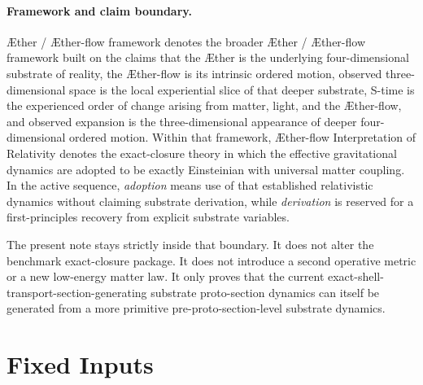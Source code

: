 \documentclass[11pt]{article}
\newcommand{\Aether}{\AE{}ther}
\newcommand{\Aflow}{\AE{}ther-flow}
\newcommand{\TheoryName}{\Aflow{} Interpretation of Relativity}
\newcommand{\TheoryProgram}{\Aether{} / \Aflow{} framework}
\begin{document}
\paragraph{Framework and claim boundary.}
\TheoryProgram{} denotes the broader \Aether{} / \Aflow{} framework built on the claims that the \Aether{} is the underlying four-dimensional substrate of reality, the \Aflow{} is its intrinsic ordered motion, observed three-dimensional space is the local experiential slice of that deeper substrate, S-time is the experienced order of change arising from matter, light, and the \Aflow{}, and observed expansion is the three-dimensional appearance of deeper four-dimensional ordered motion. Within that framework, \TheoryName{} denotes the exact-closure theory in which the effective gravitational dynamics are adopted to be exactly Einsteinian with universal matter coupling. In the active sequence, \emph{adoption} means use of that established relativistic dynamics without claiming substrate derivation, while \emph{derivation} is reserved for a first-principles recovery from explicit substrate variables.

The present note stays strictly inside that boundary. It does not alter the benchmark exact-closure package. It does not introduce a second operative metric or a new low-energy matter law. It only proves that the current exact-shell-transport-section-generating substrate proto-section dynamics can itself be generated from a more primitive pre-proto-section-level substrate dynamics.

\section{Fixed Inputs}
\end{document}
